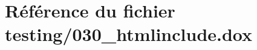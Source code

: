 \hypertarget{030__htmlinclude_8dox}{}\section{Référence du fichier testing/030\+\_\+htmlinclude.dox}
\label{030__htmlinclude_8dox}
